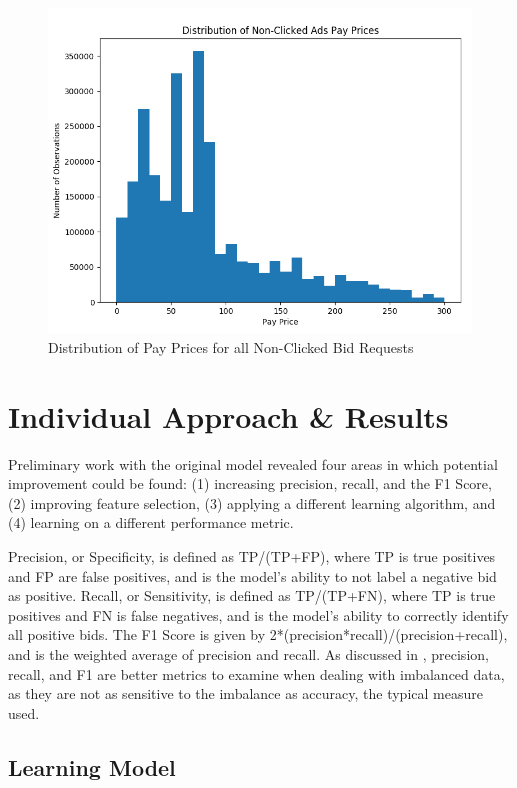 \documentclass{sig-alternate-05-2015}
\begin{document}
\begin{figure}
\begin {minipage}{0.5\textwidth}
     \centering
     \includegraphics[width=1\textwidth]{payPriceDistNonClicked.png}
     \caption{Distribution of Pay Prices for all Non-Clicked Bid Requests}
     \label{payPriceDistNonClicked}
   \end{minipage}
\end{figure}

\section{Individual  Approach \& Results} \label{approach}
Preliminary work with the original model revealed four areas in which potential improvement could be found: (1) increasing precision, recall, and the F1 Score, (2) improving feature selection, (3) applying a different learning algorithm, and (4) learning on a different performance metric.

Precision, or Specificity, is defined as TP/(TP+FP), where TP is true positives and FP are false positives, and is the model's ability to not label a negative bid as positive.  Recall, or Sensitivity, is defined as TP/(TP+FN), where TP is true positives and FN is false negatives, and is the model's ability to correctly identify all positive bids. The F1 Score is given by 2*(precision*recall)/(precision+recall), and is the weighted average of precision and recall. As discussed in \cite{imbalanced}, precision, recall, and F1 are better metrics to examine when dealing with imbalanced data, as they are not as sensitive to the imbalance as accuracy, the typical measure used.

\subsection{Learning Model}
\end{document}
